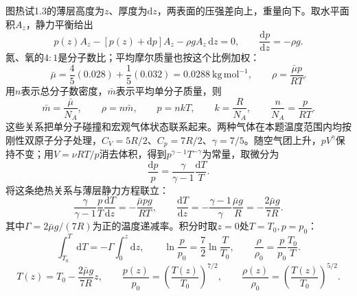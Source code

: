 \documentclass[UTF8,fontset=fandol,a4paper,11pt]{ctexart}
\begin{document}
图热试1.3的薄层高度为$z$、厚度为$\mathrm dz$，两表面的压强差向上，重量向下。取水平面积$A_z$，静力平衡给出
\[
p(z)A_z-[p(z)+\mathrm dp]A_z-\rho g A_z\,\mathrm dz=0,
\qquad
\boxed{\frac{\mathrm dp}{\mathrm dz}=-\rho g}.
\]
氮、氧的$4:1$是分子数比；平均摩尔质量也按这个比例加权：
\[
\bar\mu=\frac45(0.028)+\frac15(0.032)
=0.0288\ \mathrm{kg\,mol^{-1}},
\qquad
\rho=\frac{\bar\mu p}{RT}.
\]
用$n$表示总分子数密度，$\bar m$表示平均单分子质量，则
\[
\bar m=\frac{\bar\mu}{N_A},\qquad \rho=n\bar m,\qquad
p=nkT,\qquad k=\frac R{N_A},\qquad
\frac n{N_A}=\frac p{RT}.
\]
这些关系把单分子碰撞和宏观气体状态联系起来。两种气体在本题温度范围内均按刚性双原子分子处理，$C_V=5R/2$、$C_p=7R/2$、$\gamma=7/5$。随空气团上升，$pV^\gamma$保持不变；用$V=\nu RT/p$消去体积，得到$p^{\gamma-1}T^{-\gamma}$为常量，取微分为
\[
\frac{\mathrm dp}{p}=\frac{\gamma}{\gamma-1}\frac{\mathrm dT}{T}.
\]
将这条绝热关系与薄层静力方程联立：
\[
\frac{\gamma}{\gamma-1}\frac{p}{T}\frac{\mathrm dT}{\mathrm dz}
=-\frac{\bar\mu p g}{RT},
\qquad
\boxed{\frac{\mathrm dT}{\mathrm dz}
=-\frac{\gamma-1}{\gamma}\frac{\bar\mu g}{R}
=-\frac{2\bar\mu g}{7R}}.
\]
其中$\Gamma=2\bar\mu g/(7R)$为正的温度递减率。积分时取$z=0$处$T=T_0,p=p_0$：
\[
\int_{T_0}^{T}\mathrm dT=-\Gamma\int_0^z\mathrm dz,\qquad
\ln\frac p{p_0}=\frac72\ln\frac T{T_0},\qquad
\frac{\rho}{\rho_0}=\frac p{p_0}\frac{T_0}{T}.
\]
\[
T(z)=T_0-\frac{2\bar\mu g}{7R}z,\qquad
\frac{p(z)}{p_0}=\left(\frac{T(z)}{T_0}\right)^{7/2},
\qquad
\frac{\rho(z)}{\rho_0}=\left(\frac{T(z)}{T_0}\right)^{5/2}.
\]
\end{document}
